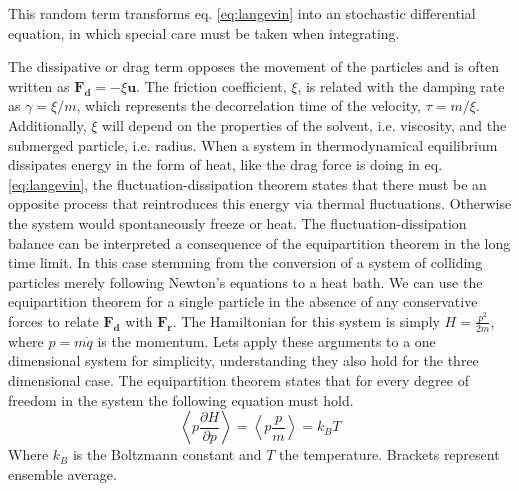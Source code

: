 \documentclass[ twoside,openright,titlepage,numbers=noenddot,%
headinclude,footinclude,cleardoublepage=empty,abstract=on,
BCOR=5mm,paper=a4,fontsize=11pt, dvipsnames
]{scrreprt}
\renewcommand{\vec}[1]{\bm{#1}}
\newcommand{\ppos}{q}
\newcommand{\pvel}{u}
\begin{document}
This random term transforms eq. \eqref{eq:langevin} into an stochastic differential equation, in which special care must be taken when integrating.

The dissipative or drag term opposes the movement of the particles and is often written as $\vec{F_d} = -\xi \vec{\pvel}$. The friction coefficient, $\xi$, is related with the damping rate as $\gamma = \xi/m$, which represents the decorrelation time of the velocity, $\tau = m/\xi$. Additionally, $\xi$ will depend on the properties of the solvent, i.e. viscosity, and the submerged particle, i.e. radius.
When a system in thermodynamical equilibrium dissipates energy in the form of heat, like the drag force is doing in eq. \eqref{eq:langevin}, the fluctuation-dissipation theorem states that there must be an opposite process that reintroduces this energy via thermal fluctuations. Otherwise the system would spontaneously freeze or heat.
The fluctuation-dissipation balance can be interpreted a consequence of the equipartition theorem in the long time limit. In this case stemming from the conversion of a system of colliding particles merely following Newton's equations to a heat bath. We can use the equipartition theorem for a single particle in the absence of any conservative forces to relate $\vec{F_d}$ with $\vec{F_r}$.
The Hamiltonian for this system is simply $H = \frac{p^2}{2m}$, where $p = m\dot{\ppos}$ is the momentum.
Lets apply these arguments to a one dimensional system for simplicity, understanding they also hold for the three dimensional case. The equipartition theorem states that for every degree of freedom in the system the following equation must hold.
\begin{equation}
  \left\langle p \frac{\partial H}{\partial p}\right\rangle = \left\langle p \frac{p}{m}\right\rangle = k_BT
\end{equation}
Where $k_B$ is the Boltzmann constant and $T$ the temperature. Brackets represent ensemble average.
\end{document}
